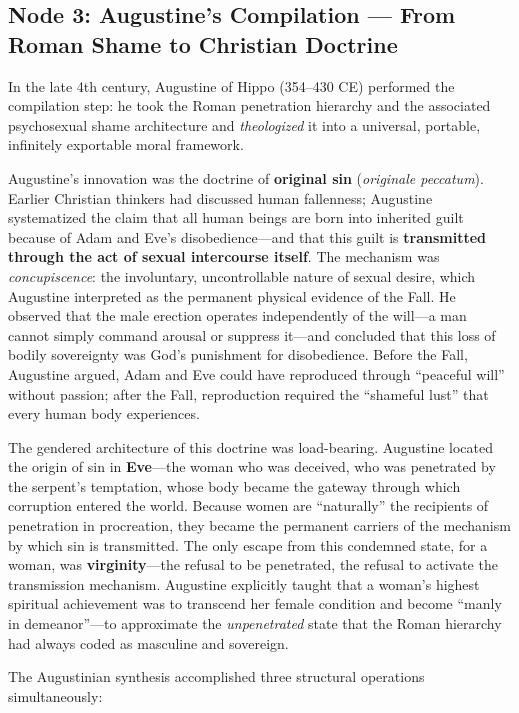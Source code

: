 \subsection{Node 3: Augustine's Compilation --- From Roman Shame to Christian Doctrine}

In the late 4th century, Augustine of Hippo (354--430 CE) performed the compilation step: he took the Roman penetration hierarchy and the associated psychosexual shame architecture and \textit{theologized} it into a universal, portable, infinitely exportable moral framework.

Augustine's innovation was the doctrine of \textbf{original sin} (\textit{originale peccatum}). Earlier Christian thinkers had discussed human fallenness; Augustine systematized the claim that all human beings are born into inherited guilt because of Adam and Eve's disobedience---and that this guilt is \textbf{transmitted through the act of sexual intercourse itself}. The mechanism was \textit{concupiscence}: the involuntary, uncontrollable nature of sexual desire, which Augustine interpreted as the permanent physical evidence of the Fall. He observed that the male erection operates independently of the will---a man cannot simply command arousal or suppress it---and concluded that this loss of bodily sovereignty was God's punishment for disobedience. Before the Fall, Augustine argued, Adam and Eve could have reproduced through ``peaceful will'' without passion; after the Fall, reproduction required the ``shameful lust'' that every human body experiences.

The gendered architecture of this doctrine was load-bearing. Augustine located the origin of sin in \textbf{Eve}---the woman who was deceived, who was penetrated by the serpent's temptation, whose body became the gateway through which corruption entered the world. Because women are ``naturally'' the recipients of penetration in procreation, they became the permanent carriers of the mechanism by which sin is transmitted. The only escape from this condemned state, for a woman, was \textbf{virginity}---the refusal to be penetrated, the refusal to activate the transmission mechanism. Augustine explicitly taught that a woman's highest spiritual achievement was to transcend her female condition and become ``manly in demeanor''---to approximate the \textit{unpenetrated} state that the Roman hierarchy had always coded as masculine and sovereign.

The Augustinian synthesis accomplished three structural operations simultaneously:


